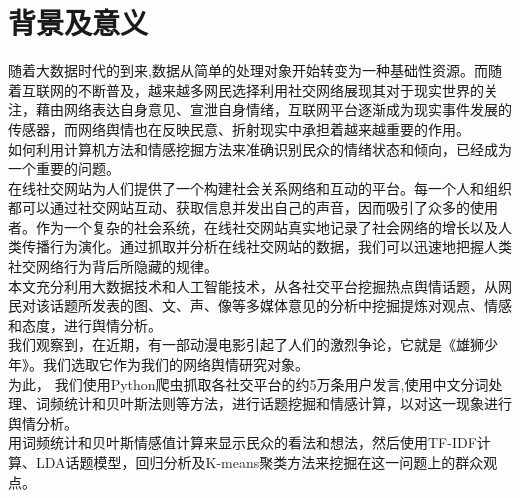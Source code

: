 \documentclass[12pt,a4paper,utf8]{article}
\begin{document}
\setcounter{page}{1}
\thispagestyle{empty} %

\newpage %

\thispagestyle{empty} %
\renewcommand{\contentsname}{\centerline{目 \quad 录}}
\begin{center}
    \tableofcontents
\end{center}

\thispagestyle{empty} %


\newpage  
\section{背景及意义}
随着大数据时代的到来,数据从简单的处理对象开始转变为一种基础性资源。而随着互联网的不断普及，越来越多网民选择利用社交网络展现其对于现实世界的关注，藉由网络表达自身意见、宣泄自身情绪，互联网平台逐渐成为现实事件发展的传感器，而网络舆情也在反映民意、折射现实中承担着越来越重要的作用。 \\

如何利用计算机方法和情感挖掘方法来准确识别民众的情绪状态和倾向，已经成为一个重要的问题。 \\ 

在线社交网站为人们提供了一个构建社会关系网络和互动的平台。每一个人和组织都可以通过社交网站互动、获取信息并发出自己的声音，因而吸引了众多的使用者。作为一个复杂的社会系统，在线社交网站真实地记录了社会网络的增长以及人类传播行为演化。通过抓取并分析在线社交网站的数据，我们可以迅速地把握人类社交网络行为背后所隐藏的规律。\\

本文充分利用大数据技术和人工智能技术，从各社交平台挖掘热点舆情话题，从网民对该话题所发表的图、文、声、像等多媒体意见的分析中挖掘提炼对观点、情感和态度，进行舆情分析。 \\

我们观察到，在近期，有一部动漫电影引起了人们的激烈争论，它就是《雄狮少年》。我们选取它作为我们的网络舆情研究对象。\\
 
为此， 我们使用Python爬虫抓取各社交平台的约5万条用户发言,使用中文分词处理、词频统计和贝叶斯法则等方法，进行话题挖掘和情感计算，以对这一现象进行舆情分析。 \\

用词频统计和贝叶斯情感值计算来显示民众的看法和想法，然后使用TF-IDF计算、LDA话题模型，回归分析及K-means聚类方法来挖掘在这一问题上的群众观点。
\end{document}
